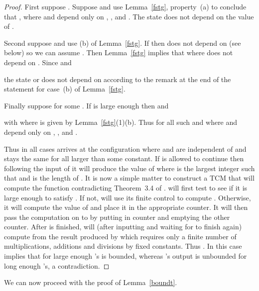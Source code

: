 \documentclass[12pt]{article}
\begin{document}
\begin{proof}
First suppose . Suppose  and use
Lemma~\ref{fstg}, property~(a) to conclude that ,
 where  and 
depend only on , , and . The state  does not depend
on the value of .

Second suppose  and use (b) of
Lemma~\ref{fstg}. If  then
 does not depend on  (see below) so we can assume
. Then Lemma~\ref{fstg} implies that
 where  does not depend on
. Since 
and

the state  or  does not depend on  according to the
remark at the end of the statement for case~(b) of Lemma~\ref{fstg}.
 
Finally suppose  for some
. If  is large enough then
 and

with  where  is given by Lemma~\ref{fstg}(1)(b).  Thus
 for all such  and
 where  and 
depend only on , , and .

Thus in all cases  arrives at the configuration
 where  and  are independent of
 and  stays the same for all  larger than some
constant. If  is allowed to continue then following the input of
 it will produce the value of  where  is the largest integer such that
 and  is the length of
. It is now a simple matter to construct a TCM  that will
compute the function  contradicting Theorem~3.4
of \cite{ibarra}.  will first test  to see if it is large
enough to satisfy . If not,  will use its finite control
to compute . Otherwise, it will compute the value of  and
place it in the appropriate counter. It will then pass the computation
on to  by putting  in counter  and emptying the other
counter. After  is finished,  will (after inputting 
and waiting for  to finish again) compute  from the
result produced by  which requires only a finite number of
multiplications, additions and divisions by fixed constants. Thus
. In this case  implies that for large enough 's
 is bounded, whereas 's output is unbounded for long enough
's, a contradiction.
\end{proof}

We can now proceed with the proof of Lemma~\ref{boundt}.
\end{document}
